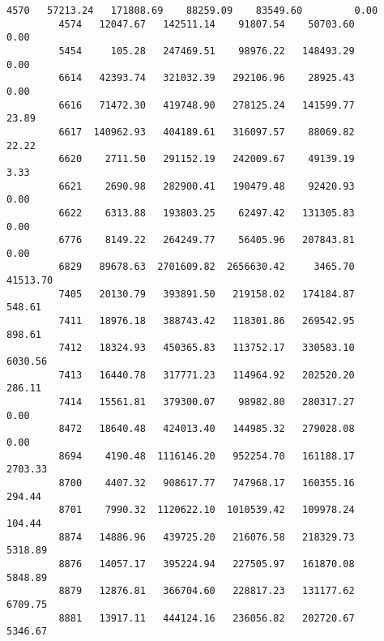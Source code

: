 \documentclass[11pt]{article}
\begin{document}
\begin{Verbatim}[commandchars=\\\{\}]
         4570   57213.24   171808.69    88259.09    83549.60         0.00   
         4574   12047.67   142511.14    91807.54    50703.60         0.00   
         5454     105.28   247469.51    98976.22   148493.29         0.00   
         6614   42393.74   321032.39   292106.96    28925.43         0.00   
         6616   71472.30   419748.90   278125.24   141599.77        23.89   
         6617  140962.93   404189.61   316097.57    88069.82        22.22   
         6620    2711.50   291152.19   242009.67    49139.19         3.33   
         6621    2690.98   282900.41   190479.48    92420.93         0.00   
         6622    6313.88   193803.25    62497.42   131305.83         0.00   
         6776    8149.22   264249.77    56405.96   207843.81         0.00   
         6829   89678.63  2701609.82  2656630.42     3465.70     41513.70   
         7405   20130.79   393891.50   219158.02   174184.87       548.61   
         7411   18976.18   388743.42   118301.86   269542.95       898.61   
         7412   18324.93   450365.83   113752.17   330583.10      6030.56   
         7413   16440.78   317771.23   114964.92   202520.20       286.11   
         7414   15561.81   379300.07    98982.80   280317.27         0.00   
         8472   18640.48   424013.40   144985.32   279028.08         0.00   
         8694    4190.48  1116146.20   952254.70   161188.17      2703.33   
         8700    4407.32   908617.77   747968.17   160355.16       294.44   
         8701    7990.32  1120622.10  1010539.42   109978.24       104.44   
         8874   14886.96   439725.20   216076.58   218329.73      5318.89   
         8876   14057.17   395224.94   227505.97   161870.08      5848.89   
         8879   12876.81   366704.60   228817.23   131177.62      6709.75   
         8881   13917.11   444124.16   236056.82   202720.67      5346.67   
         

\end{Verbatim}
\end{document}
